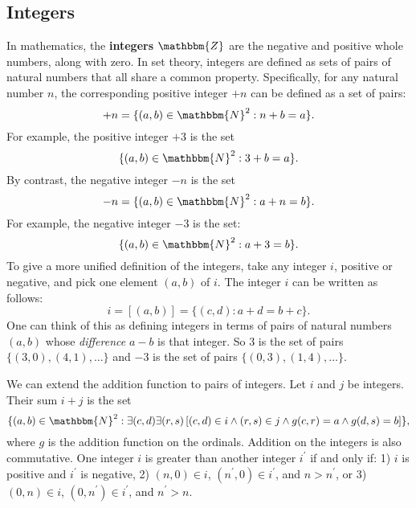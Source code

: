 \documentclass[11pt]{article}
\theoremstyle{definition}
\theoremstyle{remark}
\begin{document}
\subsection{Integers}
In mathematics, the \textbf{integers} $\mathbbm{Z}$ are the negative and positive whole numbers, along with zero. In set theory, integers are defined as sets of pairs of natural numbers that all share a common property. Specifically, for any natural number $n$, the corresponding positive integer $+n$ can be defined as a set of pairs:
$$+n=\{(a,b)\in\mathbbm{N}^{2}:n+b=a\}.$$ For example, the positive integer $+3$ is the set $$\{(a,b)\in\mathbbm{N}^{2}:3+b=a\}.$$ By contrast, the negative integer $-n$ is the set $$-n=\{(a,b)\in\mathbbm{N}^{2}:a+n=b\}.$$ For example, the negative integer $-3$ is the set: $$\{(a,b)\in\mathbbm{N}^{2}:a+3=b\}.$$
To give a more unified definition of the integers, take any integer $i$, positive or negative, and pick one element $(a,b)$ of $i$. The integer $i$ can be written as follows:
$$i=[(a,b)]=\{(c,d):a+d = b + c\}.$$
One can think of this as defining integers in terms of pairs of natural numbers $(a,b)$ whose \textit{difference} $a-b$ is that integer. So $3$ is the set of pairs $\{(3,0),(4,1),\dots\}$ and $-3$ is the set of pairs $\{(0,3),(1,4),\dots\}$.

We can extend the addition function to pairs of integers. Let $i$ and $j$ be integers. Their sum $i+j$ is the set
$$\{(a,b)\in\mathbbm{N}^{2}:\exists(c,d)\exists(r,s) \left[(c,d)\in i \wedge (r,s)\in j\wedge g(c,r)=a\wedge g(d,s)=b\right]\},$$ 
where $g$ is the addition function on the ordinals. Addition on the integers is also commutative. One integer $i$ is greater than another integer $i^{\prime}$ if and only if: 1) $i$ is positive and $i^{\prime}$ is negative, 2) $(n,0)\in i$, $(n^{\prime},0)\in i^{\prime}$, and $n>n^{\prime}$, or 3) $(0,n)\in i$, $(0,n^{\prime})\in i^{\prime}$, and $n^{\prime}>n$. 
\end{document}
